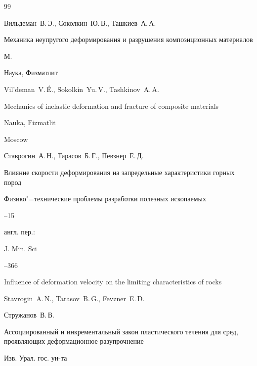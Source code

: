 \begin{thebibliography}{99}

\by Вильдеман~В.\,Э., Соколкин~Ю.\,В., Ташкиев~А.\,А.

\book Механика неупругого деформирования и разрушения композиционных материалов

\publaddr М.

\publ Наука, Физматлит



\misctransl

\by Vil'deman~V.\,\'E., Sokolkin~Yu.\,V., Tashkinov~A.\,A. 

\book Mechanics of inelastic deformation and fracture of composite materials

\publ Nauka, Fizmatlit 

\publaddr Moscow






\by Ставрогин~А.\,Н., Тарасов~Б.\,Г., Певзнер~Е.\,Д.

\paper Влияние скорости деформирования на запредельные характеристики горных пород

\jour Физико"=технические проблемы разработки полезных ископаемых



--15

\transl англ. пер.:~

\jour  J. Min. Sci




--366

\paper Influence of deformation velocity on the limiting characteristics of rocks

\by  Stavrogin~A.\,N., Tarasov~B.\,G., Fevzner~E.\,D.






\by Стружанов~В.\,В.

\paper Ассоциированный и инкрементальный закон пластического течения для сред, проявляющих деформационное разупрочнение

\jour Изв. Урал. гос. ун-та



\end{thebibliography}
